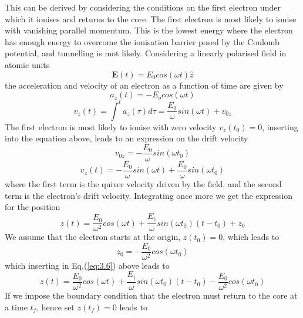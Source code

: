 \documentclass[11pt]{article}
\numberwithin{equation}{section}
\begin{document}
\newline
This can be derived by considering the conditions on the first electron under which it ionises and returns to the core. The first electron is most likely to ionise with vanishing parallel momentum. This is the lowest energy where the electron has enough energy to overcome the ionisation barrier posed by the Coulomb potential, and tunnelling is mot likely.
\newline
Considering a linearly polarised field in atomic units 
\begin{equation}
    \mathbf{E}(t) = E_0 cos(\omega t) \hat{z}
\end{equation}
the acceleration and velocity of an electron as a function of time are given by
\begin{equation}
    a_z(t) = -E_o cos(\omega t)
\end{equation}
\begin{equation}
    v_z(t) = \int^t a_z(\tau) d\tau = \frac{E_0}{\omega} sin(\omega t) + v_{0z}
\end{equation}
The first electron is most likely to ionise with zero velocity $v_z(t_0) = 0$, inserting into the equation above, leads to an expression on the drift velocity
\begin{equation}
    v_{0z} = -\frac{E_0}{\omega} sin(\omega t_0)
\end{equation}
\begin{equation} \label{eq:3.5}
    v_z(t) = -\frac{E_0}{\omega} sin(\omega t) + \frac{E_0}{\omega} sin(\omega t_0)
\end{equation}
where the first term is the quiver velocity driven by the field, and the second term is the electron's drift velocity. Integrating once more we get the expression for the position
\begin{equation} \label{eq:3.6}
    z(t) = \frac{E_0}{\omega^2} cos(\omega t) + \frac{E_)}{\omega} sin(\omega t_0)(t-t_0) + z_0
\end{equation}
We assume that the electron starts at the origin, $z(t_0) = 0$, which leads to 
\begin{equation}
    z_0 = -\frac{E_0}{\omega^2} cos(\omega t_0)
\end{equation}
which inserting in Eq.(\ref{eq:3.6}) above leads to
\begin{equation}
    z(t) = \frac{E_0}{\omega^2} cos(\omega t) + \frac{E_)}{\omega} sin(\omega t_0)(t-t_0) - \frac{E_0}{\omega^2} cos(\omega t_0)
\end{equation}
If we impose the boundary condition that the electron must return to the core at a time $t_f$, hence set $z(t_f) = 0$ leads to
\end{document}
